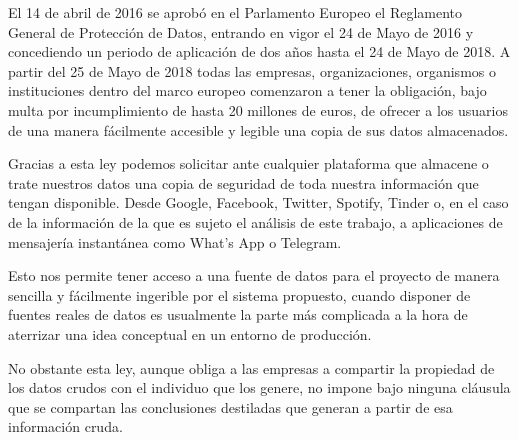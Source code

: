 
El 14 de abril de 2016 se aprobó en el Parlamento Europeo el Reglamento General de Protección de Datos\cite{RGPD}, entrando en vigor el 24 de Mayo de 2016 y concediendo un periodo de aplicación de dos años hasta el 24 de Mayo de 2018. A partir del 25 de Mayo de 2018 todas las empresas, organizaciones, organismos o instituciones dentro del marco europeo comenzaron a tener la obligación, bajo multa por incumplimiento de hasta 20 millones de euros, de ofrecer a los usuarios de una manera fácilmente accesible y legible una copia de sus datos almacenados.

Gracias a esta ley podemos solicitar ante cualquier plataforma que almacene o trate nuestros datos una copia de seguridad de toda nuestra información que tengan disponible. Desde Google, Facebook, Twitter, Spotify, Tinder o, en el caso de la información de la que es sujeto el análisis de este trabajo, a aplicaciones de mensajería instantánea como What's App o Telegram.

Esto nos permite tener acceso a una fuente de datos para el proyecto de manera sencilla y fácilmente ingerible por el sistema propuesto, cuando disponer de fuentes reales de datos es usualmente la parte más complicada a la hora de aterrizar una idea conceptual en un entorno de producción.

No obstante esta ley, aunque obliga a las empresas a compartir la propiedad de los datos crudos con el individuo que los genere, no impone bajo ninguna cláusula que se compartan las conclusiones destiladas que generan a partir de esa información cruda.

\newpage
